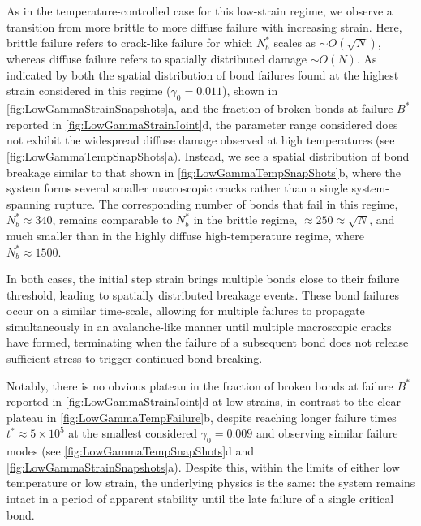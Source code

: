 As in the temperature-controlled case for this low-strain regime, we observe a transition from more brittle to more diffuse failure with increasing strain. Here, brittle failure refers to crack-like failure for which $N_b^*$ scales as $\sim O(\sqrt{N})$, whereas diffuse failure refers to spatially distributed damage $\sim O(N)$. As indicated by both the spatial distribution of bond failures found at the highest strain considered in this regime ($\gamma_0=0.011$), shown in \cref{fig:LowGammaStrainSnapshots}a, and the fraction of broken bonds at failure $B^*$ reported in \cref{fig:LowGammaStrainJoint}d, the parameter range considered does not exhibit the widespread diffuse damage observed at high temperatures (see \cref{fig:LowGammaTempSnapShots}a). Instead, we see a spatial distribution of bond breakage similar to that shown in \cref{fig:LowGammaTempSnapShots}b, where the system forms several smaller macroscopic cracks rather than a single system-spanning rupture. The corresponding number of bonds that fail in this regime, $N_b^* \approx 340$, remains comparable to $N_b^*$ in the brittle regime, $\approx 250 \approx \sqrt{N}$, and much smaller than in the highly diffuse high-temperature regime, where $N_b^* \approx 1500$.

In both cases, the initial step strain brings multiple bonds close to their failure threshold, leading to spatially distributed breakage events. These bond failures occur on a similar time-scale, allowing for multiple failures to propagate simultaneously in an avalanche-like manner until multiple macroscopic cracks have formed, terminating when the failure of a subsequent bond does not release sufficient stress to trigger continued bond breaking.

Notably, there is no obvious plateau in the fraction of broken bonds at failure $B^*$ reported in \cref{fig:LowGammaStrainJoint}d at low strains, in contrast to the clear plateau in \cref{fig:LowGammaTempFailure}b, despite reaching longer failure times $t^*\approx 5\times 10^{5}$ at the smallest considered $\gamma_0=0.009$ and observing similar failure modes (see \cref{fig:LowGammaTempSnapShots}d and \cref{fig:LowGammaStrainSnapshots}a). Despite this, within the limits of either low temperature or low strain, the underlying physics is the same: the system remains intact in a period of apparent stability until the late failure of a single critical bond. 


